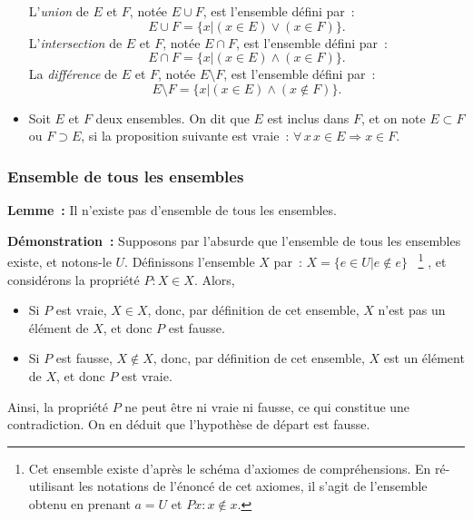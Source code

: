 \begin{itemize}
L'\textit{union} de $E$ et $F$, notée $E \cup F$, est l'ensemble défini par : 
\begin{equation*}
    E \cup F = \lbrace x \vert (x \in E) \vee (x \in F)  \rbrace . 
\end{equation*}
L'\textit{intersection} de $E$ et $F$, notée $E \cap F$, est l'ensemble défini par :
\begin{equation*}
    E \cap F = \lbrace x \vert (x \in E) \wedge (x \in F)  \rbrace. 
\end{equation*}
La \textit{différence} de $E$ et $F$, notée $E \setminus F$, est l'ensemble défini par :
\begin{equation*}
    E \setminus F = \lbrace x \vert (x \in E) \wedge (x \notin F)  \rbrace. 
\end{equation*}
\item Soit $E$ et $F$ deux ensembles.
On dit que $E$ est inclus dans $F$, et on note $E \subset F$ ou $F \supset E$, si la proposition suivante est vraie : $\forall \, x \, x \in E \Rightarrow x \in F$. 
\end{itemize}

\subsubsection{Ensemble de tous les ensembles} 

\noindent\textbf{Lemme :} Il n'existe pas d'ensemble de tous les ensembles. 

\medskip

\noindent\textbf{Démonstration :} Supposons par l'absurde que l'ensemble de tous les ensembles existe, et notons-le $U$. 
Définissons l'ensemble $X$ par : $X = \lbrace e \in U \vert e \notin e \rbrace$%
~\footnote{
    Cet ensemble existe d'après le schéma d'axiomes de compréhensions. 
    En ré-utilisant les notations de l'énoncé de cet axiomes, il s'agit de l'ensemble obtenu en prenant $a = U$ et $P x: x \notin x$.
}%
, et considérons la propriété $P: X \in X$. 
Alors, 
\begin{itemize}[nosep]
    \item Si $P$ est vraie, $X \in X$, donc, par définition de cet ensemble, $X$ n'est pas un élément de $X$, et donc $P$ est fausse. 
    \item Si $P$ est fausse, $X \notin X$, donc, par définition de cet ensemble, $X$ est un élément de $X$, et donc $P$ est vraie. 
\end{itemize}
Ainsi, la propriété $P$ ne peut être ni vraie ni fausse, ce qui constitue une contradiction. 
On en déduit que l'hypothèse de départ est fausse. 

